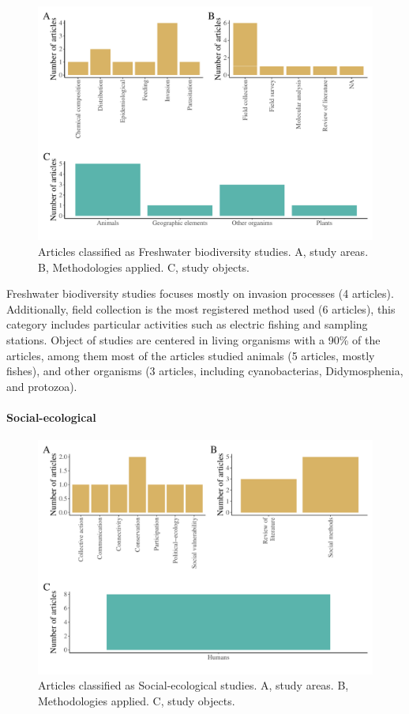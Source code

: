 \documentclass[]{article}
\let\oldparagraph\paragraph
\renewcommand{\paragraph}[1]{\oldparagraph{#1}\mbox{}}
\begin{document}
\begin{figure}
\centering
\includegraphics{Review_and_climate_files/figure-latex/Fresh-1.pdf}
\caption{\label{fig:Fresh}Articles classified as Freshwater biodiversity studies. A, study areas. B, Methodologies applied. C, study objects.}
\end{figure}

Freshwater biodiversity studies focuses mostly on invasion processes (4 articles). Additionally, field collection is the most registered method used (6 articles), this category includes particular activities such as electric fishing and sampling stations.
Object of studies are centered in living organisms with a 90\% of the articles, among them most of the articles studied animals (5 articles, mostly fishes), and other organisms (3 articles, including cyanobacterias, Didymosphenia, and protozoa).

\hypertarget{social-ecological}{%
\paragraph{Social-ecological}\label{social-ecological}}

\begin{figure}
\centering
\includegraphics{Review_and_climate_files/figure-latex/Social-1.pdf}
\caption{\label{fig:Social}Articles classified as Social-ecological studies. A, study areas. B, Methodologies applied. C, study objects.}
\end{figure}
\end{document}

